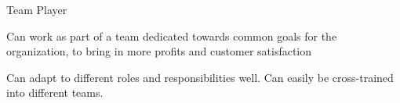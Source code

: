 \begin{cventries}
\cventry
{} %
{ Team Player } %
{} %
{} %
{
	\begin{cvitems} %
		\item { Can work as part of a team dedicated towards common goals for the organization, to bring in more profits and customer satisfaction}
		\item { Can adapt to different roles and responsibilities well. Can easily be cross-trained into different teams.}
	\end{cvitems}
}

\end{cventries}
